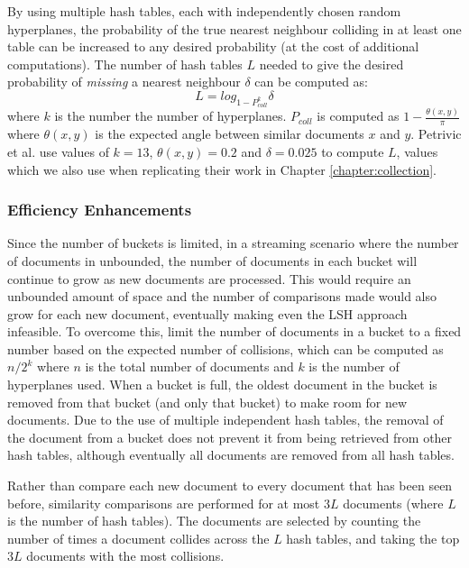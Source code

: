 By using multiple hash tables, each with independently chosen random hyperplanes, the probability of the true nearest neighbour colliding in at least one table can be increased to any desired probability (at the cost of additional computations).
The number of hash tables $L$ needed to give the desired probability of \emph{missing} a nearest neighbour $\delta$ can be computed as:
\begin{equation}
	L = log_{1-P^k_{coll}} \delta
\end{equation}
where $k$ is the number the number of hyperplanes. $P_{coll}$ is computed as $1-\frac{\theta(x,y)}{\pi}$ where $\theta(x,y)$ is the expected angle between similar documents $x$ and $y$.
Petrivic et al. use values of $k = 13$, $\theta(x,y) = 0.2$ and $\delta = 0.025$ to compute $L$, values which we also use when replicating their work in Chapter \ref{chapter:collection}.

\subsubsection{Efficiency Enhancements}
Since the number of buckets is limited, in a streaming scenario where the number of documents in unbounded, the number of documents in each bucket will continue to grow as new documents are processed.
This would require an unbounded amount of space and the number of comparisons made would also grow for each new document, eventually making even the LSH approach infeasible.
To overcome this, \cite{Petrovic:2010:SFS:1857999.1858020} limit the number of documents in a bucket to a fixed number based on the expected number of collisions, which can be computed as $n/2^k$ where $n$ is the total number of documents and $k$ is the number of hyperplanes used.
When a bucket is full, the oldest document in the bucket is removed from that bucket (and only that bucket) to make room for new documents.
Due to the use of multiple independent hash tables, the removal of the document from a bucket does not prevent it from being retrieved from other hash tables, although eventually all documents are removed from all hash tables.

Rather than compare each new document to every document that has been seen before, similarity comparisons are performed for at most $3L$ documents (where $L$ is the number of hash tables).
The documents are selected by counting the number of times a document collides across the $L$ hash tables, and taking the top $3L$ documents with the most collisions.

